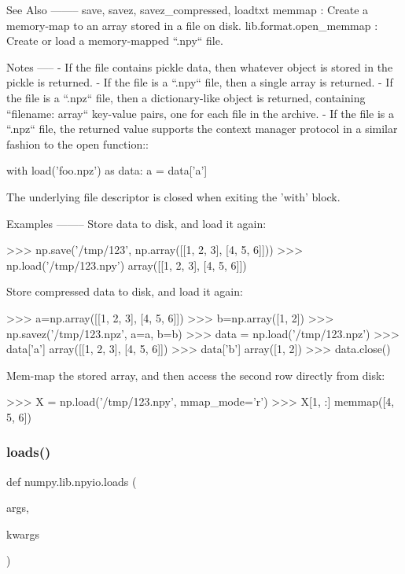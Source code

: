 \begin{DoxyVerb}
See Also
--------
save, savez, savez_compressed, loadtxt
memmap : Create a memory-map to an array stored in a file on disk.
lib.format.open_memmap : Create or load a memory-mapped ``.npy`` file.

Notes
-----
- If the file contains pickle data, then whatever object is stored
  in the pickle is returned.
- If the file is a ``.npy`` file, then a single array is returned.
- If the file is a ``.npz`` file, then a dictionary-like object is
  returned, containing ``{filename: array}`` key-value pairs, one for
  each file in the archive.
- If the file is a ``.npz`` file, the returned value supports the
  context manager protocol in a similar fashion to the open function::

    with load('foo.npz') as data:
        a = data['a']

  The underlying file descriptor is closed when exiting the 'with'
  block.

Examples
--------
Store data to disk, and load it again:

>>> np.save('/tmp/123', np.array([[1, 2, 3], [4, 5, 6]]))
>>> np.load('/tmp/123.npy')
array([[1, 2, 3],
       [4, 5, 6]])

Store compressed data to disk, and load it again:

>>> a=np.array([[1, 2, 3], [4, 5, 6]])
>>> b=np.array([1, 2])
>>> np.savez('/tmp/123.npz', a=a, b=b)
>>> data = np.load('/tmp/123.npz')
>>> data['a']
array([[1, 2, 3],
       [4, 5, 6]])
>>> data['b']
array([1, 2])
>>> data.close()

Mem-map the stored array, and then access the second row
directly from disk:

>>> X = np.load('/tmp/123.npy', mmap_mode='r')
>>> X[1, :]
memmap([4, 5, 6])\end{DoxyVerb}
 \mbox{\label{namespacenumpy_1_1lib_1_1npyio_a33c123b21f15823a7f66569087ba47c9}} 
\subsubsection{\texorpdfstring{loads()}{loads()}}
{\footnotesize\ttfamily def numpy.\+lib.\+npyio.\+loads (\begin{DoxyParamCaption}\item[{}]{args,  }\item[{}]{kwargs }\end{DoxyParamCaption})}


